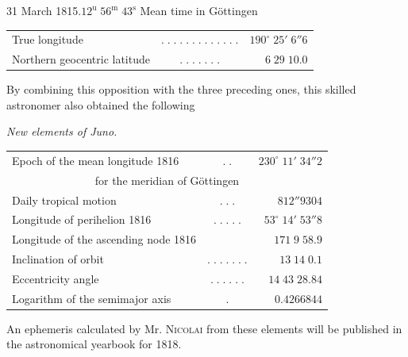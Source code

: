 \begin{center}31 March 1815.\quad $12^{\mathrm u}\;56^{\mathrm m}\;43^{\mathrm s}$ Mean time in Göttingen\end{center}
\begin{center}\fontsize{9}{11}\selectfont\setlength{\tabcolsep}{2pt}\renewcommand{\arraystretch}{1.15}\begin{tabular}{lcr}
True longitude & $.\;.\;.\;.\;.\;.\;.\;.\;.\;.\;.\;.\;.$ & $190^\circ\;25'\;6''6$\\
Northern geocentric latitude & $.\;.\;.\;.\;.\;.\;.$ & $6\;29\;10.0$\\
\end{tabular}\end{center}

\par\indent By combining this opposition with the three preceding ones, this skilled astronomer also obtained the following

\begin{center}
\emph{New elements of Juno.}
\end{center}

\begin{center}\fontsize{9}{11}\selectfont\setlength{\tabcolsep}{2pt}\renewcommand{\arraystretch}{1.15}\begin{tabular}{lcr}
Epoch of the mean longitude 1816 & $.\;.$ & $230^\circ\;11'\;34''2$\\
\multicolumn{3}{c}{for the meridian of Göttingen}\\
Daily tropical motion & $.\;.\;.$ & $812''9304$\\
Longitude of perihelion 1816 & $.\;.\;.\;.\;.$ & $53^\circ\;14'\;53''8$\\
Longitude of the ascending node 1816 &  & $171\;9\;58.9$\\
Inclination of orbit & $.\;.\;.\;.\;.\;.\;.$ & $13\;14\;0.1$\\
Eccentricity angle & $.\;.\;.\;.\;.\;.$ & $14\;43\;28.84$\\
Logarithm of the semimajor axis & $.$ & $0.4266844$\\
\end{tabular}\end{center}

\par\indent An ephemeris calculated by Mr. \textsc{Nicolai} from these elements will be published in the astronomical yearbook for 1818.
